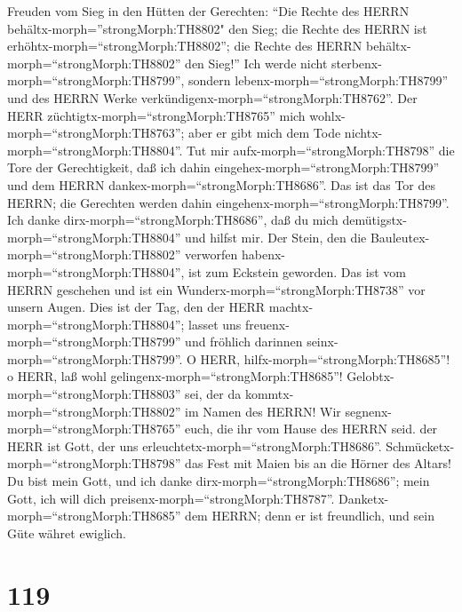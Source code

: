 Freuden vom Sieg in den Hütten der Gerechten: ``Die Rechte des HERRN
behältx-morph=''strongMorph:TH8802" den Sieg;  die Rechte
des HERRN ist erhöhtx-morph=``strongMorph:TH8802''; die Rechte des HERRN
behältx-morph=``strongMorph:TH8802'' den Sieg!''  Ich werde
nicht sterbenx-morph=``strongMorph:TH8799'', sondern
lebenx-morph=``strongMorph:TH8799'' und des HERRN Werke
verkündigenx-morph=``strongMorph:TH8762''.  Der HERR
züchtigtx-morph=``strongMorph:TH8765'' mich
wohlx-morph=``strongMorph:TH8763''; aber er gibt mich dem Tode
nichtx-morph=``strongMorph:TH8804''.  Tut mir
aufx-morph=``strongMorph:TH8798'' die Tore der Gerechtigkeit, daß ich
dahin eingehex-morph=``strongMorph:TH8799'' und dem HERRN
dankex-morph=``strongMorph:TH8686''.  Das ist das Tor des
HERRN; die Gerechten werden dahin
eingehenx-morph=``strongMorph:TH8799''.  Ich danke
dirx-morph=``strongMorph:TH8686'', daß du mich
demütigstx-morph=``strongMorph:TH8804'' und hilfst mir. 
Der Stein, den die Bauleutex-morph=``strongMorph:TH8802'' verworfen
habenx-morph=``strongMorph:TH8804'', ist zum Eckstein geworden.
 Das ist vom HERRN geschehen und ist ein
Wunderx-morph=``strongMorph:TH8738'' vor unsern Augen. 
Dies ist der Tag, den der HERR machtx-morph=``strongMorph:TH8804'';
lasset uns freuenx-morph=``strongMorph:TH8799'' und fröhlich darinnen
seinx-morph=``strongMorph:TH8799''.  O HERR,
hilfx-morph=``strongMorph:TH8685''! o HERR, laß wohl
gelingenx-morph=``strongMorph:TH8685''! 
Gelobtx-morph=``strongMorph:TH8803'' sei, der da
kommtx-morph=``strongMorph:TH8802'' im Namen des HERRN! Wir
segnenx-morph=``strongMorph:TH8765'' euch, die ihr vom Hause des HERRN
seid.  der HERR ist Gott, der uns
erleuchtetx-morph=``strongMorph:TH8686''.
Schmücketx-morph=``strongMorph:TH8798'' das Fest mit Maien bis an die
Hörner des Altars!  Du bist mein Gott, und ich danke
dirx-morph=``strongMorph:TH8686''; mein Gott, ich will dich
preisenx-morph=``strongMorph:TH8787''. 
Danketx-morph=``strongMorph:TH8685'' dem HERRN; denn er ist freundlich,
und sein Güte währet ewiglich.

\hypertarget{section-118}{%
\section{119}\label{section-118}}

